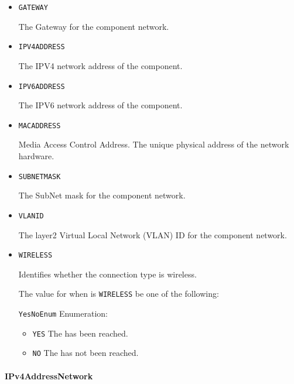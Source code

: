 \begin{itemize}

\item \texttt{GATEWAY}


The Gateway for the component network.

\item \texttt{IPV4\textunderscore ADDRESS}


The IPV4 network address of the component.


\item \texttt{IPV6\textunderscore ADDRESS}


The IPV6 network address of the component.


\item \texttt{MAC\textunderscore ADDRESS}


Media Access Control Address. The unique physical address of the network hardware.


\item \texttt{SUBNET\textunderscore MASK}


The SubNet mask for the component network.


\item \texttt{VLAN\textunderscore ID}


The layer2 Virtual Local Network (VLAN) ID for the component network.

\item \texttt{WIRELESS}


Identifies whether the connection type is wireless.


The value for  when  is \texttt{WIRELESS} \MUST be one of the following: 


\texttt{YesNoEnum} Enumeration:

\begin{itemize}
\item \texttt{YES} \newline The  has been reached. 
\item \texttt{NO} \newline The  has not been reached. 
\end{itemize}


\end{itemize}

\paragraph{IPv4AddressNetwork}\mbox{}
\label{sec:IPv4AddressNetwork}


